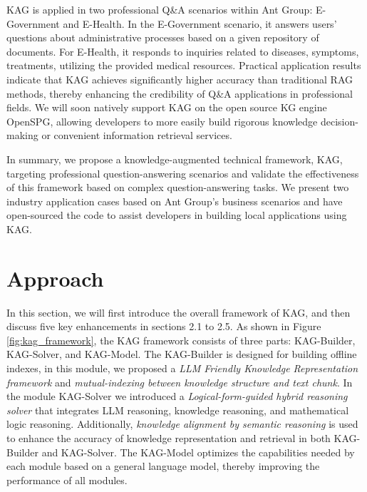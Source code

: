\documentclass{article}
\begin{document}
KAG is applied in two professional Q\&A scenarios within Ant Group: E-Government and E-Health. In the E-Government scenario, it answers users' questions about administrative processes based on a given repository of documents. For E-Health, it responds to inquiries related to diseases, symptoms, treatments, utilizing the provided medical resources. Practical application results indicate that KAG achieves significantly higher accuracy than traditional RAG methods, thereby enhancing the credibility of Q\&A applications in professional fields. We will soon natively support KAG on the open source KG engine OpenSPG, allowing developers to more easily build rigorous knowledge decision-making or convenient information retrieval services. 

In summary, we propose a knowledge-augmented technical framework, KAG, targeting professional question-answering scenarios and validate the effectiveness of this framework based on complex question-answering tasks. We present two industry application cases based on Ant Group's business scenarios and have open-sourced the code to assist developers in building local applications using KAG.

\section{Approach}
In this section, we will first introduce the overall framework of KAG, and then discuss five key enhancements in sections 2.1 to 2.5. As shown in Figure \ref{fig:kag_framework}, the KAG framework consists of three parts: KAG-Builder, KAG-Solver, and KAG-Model. The KAG-Builder is designed for building offline indexes, in this module, we proposed a \textit{LLM Friendly Knowledge Representation framework} and \textit{mutual-indexing between knowledge structure and text chunk}. In the module KAG-Solver we introduced a \textit{Logical-form-guided hybrid reasoning solver} that integrates LLM reasoning, knowledge reasoning, and mathematical logic reasoning. Additionally, \textit{knowledge alignment by semantic reasoning} is used to enhance the accuracy of knowledge representation and retrieval in both KAG-Builder and KAG-Solver. The KAG-Model optimizes the capabilities needed by each module based on a general language model, thereby improving the performance of all modules.
\end{document}
